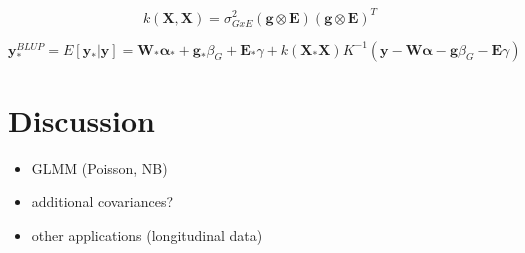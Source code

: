 \begin{equation}
    k(\mathbf{X},\mathbf{X}) = \sigma_{GxE}^2(\mathbf{g}\otimes\mathbf{E})(\mathbf{g}\otimes\mathbf{E})^T
\end{equation}

\begin{equation}
\mathbf{y}_{*}^{BLUP} = E[\mathbf{y}_*|\mathbf{y}] = 
\mathbf{W}_*\boldsymbol{\alpha}_{*}+\mathbf{g}_*\beta_G+\mathbf{E}_*\gamma + 
k(\mathbf{X}_*\mathbf{X})K^{-1}(\mathbf{y}-\mathbf{W}\boldsymbol{\alpha}-\mathbf{g}\beta_G-\mathbf{E}\gamma)
\end{equation}

\section{Discussion}

\begin{itemize}
    \item GLMM (Poisson, NB)
    \item additional covariances?
    \item other applications (longitudinal data)
\end{itemize}
